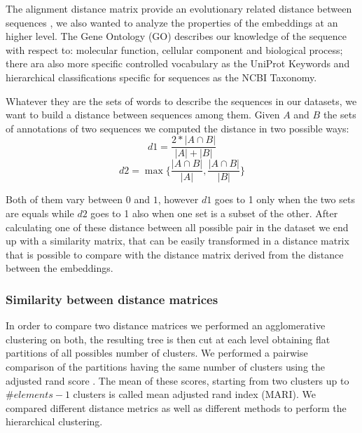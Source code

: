 \documentclass[12pt, letterpaper, twocolumn]{article}
\begin{document}
The alignment distance matrix provide an evolutionary related distance between sequences \cite{SOFI202247}, we also wanted to analyze the properties of the embeddings at an higher level. The Gene Ontology (GO) describes our knowledge of the sequence with respect to: molecular function, cellular component and biological process; there ara also more specific controlled vocabulary as the UniProt Keywords and hierarchical classifications specific for sequences as the NCBI Taxonomy.

Whatever they are the sets of words to describe the sequences in our datasets, we want to build a distance between sequences among them. Given $A$ and $B$ the sets of annotations of two sequences we computed the distance in two possible ways: $$d1 = \frac{2 * |A \cap B|}{|A| + |B|} $$ $$d2 = \max\{ \frac{|A \cap B|}{|A|}, \frac{|A \cap B|}{|B|} \} $$

Both of them vary between $0$ and $1$, however $d1$ goes to 1 only when the two sets are equals while $d2$ goes to 1 also when one set is a subset of the other. After calculating one of these distance between all possible pair in the dataset we end up with a similarity matrix, that can be easily transformed in a distance matrix that is possible to compare with the distance matrix derived from the distance between the embeddings.

\subsubsection{Similarity between distance matrices \label{sec:similarity}}
In order to compare two distance matrices we performed an agglomerative clustering on both, the resulting tree is then cut at each level obtaining flat partitions of all possibles number of clusters. We performed a pairwise comparison of the partitions having the same number of clusters using the adjusted rand score \cite{hubert1985comparing}. The mean of these scores, starting from two clusters up to $ \#elements - 1 $ clusters is called mean adjusted rand index (MARI). We compared different distance metrics as well as different methods to perform the hierarchical clustering.
\end{document}
